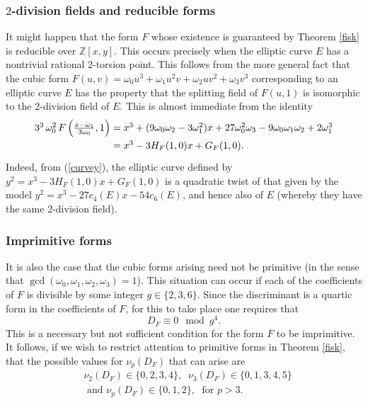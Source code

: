 \subsubsection{$2$-division fields and reducible forms}
It might happen that the form $F$ whose existence is guaranteed by Theorem \ref{fisk} is reducible over $\mathbb{Z}[x,y]$. This occurs precisely when the elliptic curve $E$ has a nontrivial rational $2$-torsion point. This follows from the more general fact that the cubic form $F(u,v) =  \omega_0 u^3 + \omega_1 u^2v + \omega_2 uv^2 + \omega_3 v^3$ corresponding to an elliptic curve $E$ has the property that the splitting field of $F(u,1)$ is isomorphic to the $2$-division field of $E$. This is almost immediate from the identity
$$
\arraycolsep=1.4pt\def\arraystretch{1.4}
\begin{array}{ll}
3^3 \, \omega_0^2 \, F \left( \frac{x-\omega_1}{3 \omega_0},1 \right) & = x^3+(9 \omega_0 \omega_2-3 \omega_1^2) x+27 \omega_0^2 \omega_3-9 \omega_0 \omega_1 \omega_2+2 \omega_1^3 \\
 & = x^3 - 3 H_F(1,0) x  + G_F (1,0). \\
\end{array}
$$
Indeed, from (\ref{curvey}), the elliptic curve defined by $y^2=x^3 - 3 H_F(1,0) x  + G_F (1,0)$
is a quadratic twist of that given by the model $y^2 = x^3 -27 c_4(E) x -54 c_6(E)$, and hence also of $E$ (whereby they have the same $2$-division field).

\subsubsection{Imprimitive forms}
It is also the case that the cubic forms arising need not be primitive (in the sense that $\gcd 
(\omega_0,\omega_1,\omega_2,\omega_3)=1$). This situation can occur if each of 
the coefficients of $F$ is divisible by some integer $g \in \{ 2, 3, 6 \}$. Since the discriminant is a quartic form in the coefficients of $F$, for this to take place one requires that
$$
D_F \equiv 0 \mod{g^4}.
$$
This is a necessary but not sufficient condition for the form $F$ to be imprimitive. It follows, if we wish to restrict attention to primitive forms in Theorem \ref{fisk}, that the possible values for $\nu_p (D_F)$ that can arise are
\begin{align} \label{lumpy}
& \nu_2 (D_F) \in \{ 0, 2, 3, 4 \}, \; \;  \nu_3 (D_F) \in \{ 0, 1, 3, 4, 5 \} \\
& \mbox{ and } \nu_p (D_F) \in \{ 0, 1, 2 \}, \; \mbox{ for } p > 3.
\end{align}


